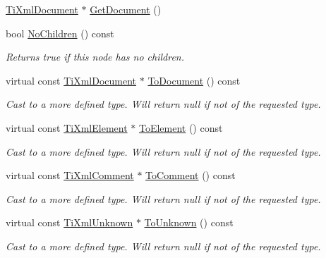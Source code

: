 \begin{DoxyCompactItemize}
\item 
\hyperlink{class_ti_xml_document}{TiXmlDocument} $\ast$ \hyperlink{class_ti_xml_node_a7b2372c0e7adfb32f5b6902fe49a39b2}{GetDocument} ()
\item 
bool \hyperlink{class_ti_xml_node_aeed21ad30630ef6e7faf096127edc9f3}{NoChildren} () const 
\begin{DoxyCompactList}\small\item\em Returns true if this node has no children. \item\end{DoxyCompactList}\item 
virtual const \hyperlink{class_ti_xml_document}{TiXmlDocument} $\ast$ \hyperlink{class_ti_xml_node_a8a4cda4b15c29f64cff419309aebed08}{ToDocument} () const 
\begin{DoxyCompactList}\small\item\em Cast to a more defined type. Will return null if not of the requested type. \item\end{DoxyCompactList}\item 
virtual const \hyperlink{class_ti_xml_element}{TiXmlElement} $\ast$ \hyperlink{class_ti_xml_node_a72abed96dc9667ab9e0a2a275301bb1c}{ToElement} () const 
\begin{DoxyCompactList}\small\item\em Cast to a more defined type. Will return null if not of the requested type. \item\end{DoxyCompactList}\item 
virtual const \hyperlink{class_ti_xml_comment}{TiXmlComment} $\ast$ \hyperlink{class_ti_xml_node_aa0a5086f9eaee910bbfdc7f975e26574}{ToComment} () const 
\begin{DoxyCompactList}\small\item\em Cast to a more defined type. Will return null if not of the requested type. \item\end{DoxyCompactList}\item 
virtual const \hyperlink{class_ti_xml_unknown}{TiXmlUnknown} $\ast$ \hyperlink{class_ti_xml_node_afd7205cf31d7a376929f8a36930627a2}{ToUnknown} () const 
\begin{DoxyCompactList}\small\item\em Cast to a more defined type. Will return null if not of the requested type. \item\end{DoxyCompactList}\item 

\end{DoxyCompactItemize}
